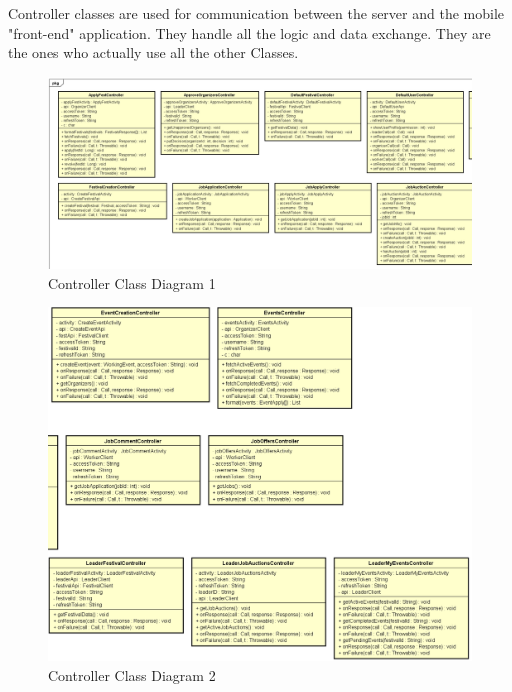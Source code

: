 			Controller classes are used for communication between the server and the mobile "front-end" application. They handle all the logic and data exchange. They are the ones who actually use all the other Classes.
			
			\begin{figure}[H]
				\includegraphics[width=\linewidth]{diagrams/Controllers Class Diagram_part1.png}
				\caption{Controller Class Diagram 1}
				\label{fig:controller_class_diag_pt1}
			\end{figure}
		
			\begin{figure}[H]
				\includegraphics[width=\linewidth]{diagrams/Controllers Class Diagram_part2.png}
				\caption{Controller Class Diagram 2}
				\label{fig:controller_class_diag_pt2}
			\end{figure}
		
